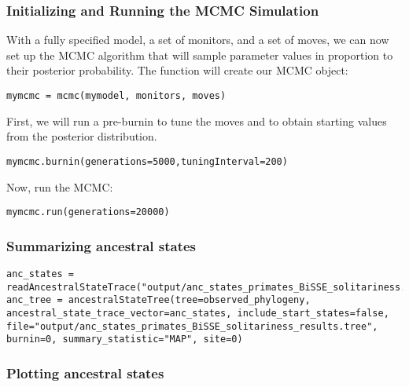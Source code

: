 \subsubsection{Initializing and Running the MCMC Simulation}

With a fully specified model, a set of monitors, and a set of moves, we can now set up the MCMC algorithm that will sample parameter values in proportion to their posterior probability. The  function will create our MCMC object:
{\tt \begin{snugshade*}
\begin{lstlisting}
mymcmc = mcmc(mymodel, monitors, moves)
\end{lstlisting}
\end{snugshade*}}

First, we will run a pre-burnin to tune the moves and to obtain starting values from the posterior distribution.
{\tt \begin{snugshade*}
\begin{lstlisting}
mymcmc.burnin(generations=5000,tuningInterval=200)
\end{lstlisting}
\end{snugshade*}}

Now, run the MCMC:
{\tt \begin{snugshade*}
\begin{lstlisting}
mymcmc.run(generations=20000)
\end{lstlisting}
\end{snugshade*}}


\subsubsection{Summarizing ancestral states}

{\tt \begin{snugshade*}
\begin{lstlisting}
anc_states = readAncestralStateTrace("output/anc_states_primates_BiSSE_solitariness.log")
anc_tree = ancestralStateTree(tree=observed_phylogeny, ancestral_state_trace_vector=anc_states, include_start_states=false, file="output/anc_states_primates_BiSSE_solitariness_results.tree", burnin=0, summary_statistic="MAP", site=0)
\end{lstlisting}
\end{snugshade*}}


\subsubsection{Plotting ancestral states}

